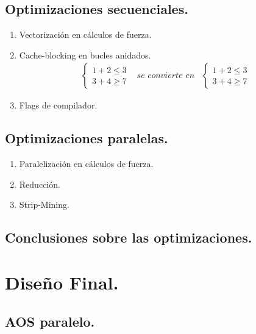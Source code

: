 \documentclass{article}
\begin{document}
\subsection{Optimizaciones secuenciales.\label{opt_seq}}
\begin{enumerate}
\item Vectorización en cálculos de fuerza.

\item Cache-blocking en bucles anidados.
\begin{equation}
	\begin{array}{rrr}
		\left\{
			\begin{array}{r}
			1+2\leq3\\
			3+4\geq7
			\end{array}
		\right.
		&
		\textit{se convierte en}
		&
		\left\{
			\begin{array}{r}
			1+2\leq3\\
			3+4\geq7
			\end{array}
		\right.
	\end{array}
\end{equation}

\item Flags de compilador.
\end{enumerate}

\subsection{Optimizaciones paralelas.\label{opt_parallel}}

\begin{enumerate}
\item Paralelización en cálculos de fuerza.

\item Reducción.

\item Strip-Mining.
\end{enumerate}

\subsection{Conclusiones sobre las optimizaciones.}

\section{Diseño Final.\label{final}}
\subsection{AOS paralelo.}
\end{document}
